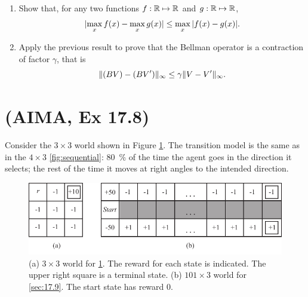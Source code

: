 \documentclass[11pt, a4paper]{article}
\begin{document}
\begin{enumerate}
    \item Show that, for any two functions $f: \mathbb{R} \mapsto \mathbb{R}$ and $g: \mathbb{R} \mapsto \mathbb{R}$,
    \begin{equation*}
        \lvert\max_x f(x) - \max_x g(x)\rvert \leq \max_x \, \lvert f(x) - g(x)\rvert .
    \end{equation*}

    \item Apply the previous result to prove that the Bellman operator is a contraction of factor $\gamma$, that is
    \begin{equation*}
        \lVert(BV) - (BV')\rVert_\infty \leq \gamma \lVert V - V'\rVert_\infty .
    \end{equation*}
\end{enumerate}

\newpage

\section{(AIMA, Ex 17.8)} \label{sec:17.8}

Consider the $3 \times 3$ world shown in Figure \ref{fig:grid-mdp}. The transition model is the same as in the $4 \times 3$ \ref{fig:sequential}: \qty{80}{\percent} of the time the agent goes in the direction it selects; the rest of the time it moves at right angles to the intended direction.

\begin{figure}[h]
    \centering
    \includegraphics{figures/e6_grid_mdp.pdf}
    \caption{(a) $3\times3$ world for \ref{sec:17.8}. The reward for each state is indicated. The upper right square is a terminal state. (b) $101 \times 3$ world for \ref{sec:17.9}. The start state has reward $0$.}
    \label{fig:grid-mdp}
\end{figure}
\end{document}
